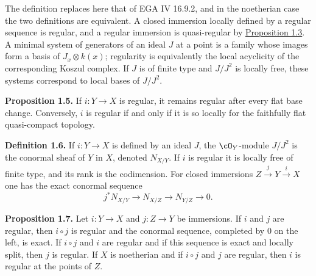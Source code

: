 The definition replaces here that of EGA IV 16.9.2, and in the noetherian case the two definitions are equivalent. A closed immersion locally defined by a regular sequence is regular, and a regular immersion is quasi-regular by \hyperlink{sga6.e07.prop.1-3}{Proposition 1.3}. A minimal system of generators of an ideal \(J\) at a point is a family whose images form a basis of \(J_x\otimes k(x)\); regularity is equivalently the local acyclicity of the corresponding Koszul complex. If \(J\) is of finite type and \(J/J^2\) is locally free, these systems correspond to local bases of \(J/J^2\).

\textbf{Proposition 1.5.} If \(i:Y\to X\) is regular, it remains regular after every flat base change. Conversely, \(i\) is regular if and only if it is so locally for the faithfully flat quasi-compact topology.

\textbf{Definition 1.6.} If \(i:Y\to X\) is defined by an ideal \(J\), the \(\cO_Y\)-module \(J/J^2\) is the conormal sheaf of \(Y\) in \(X\), denoted \(N_{X/Y}\). If \(i\) is regular it is locally free of finite type, and its rank is the codimension. For closed immersions \(Z\xrightarrow{j}Y\xrightarrow{i}X\) one has the exact conormal sequence
\begin{equation}\tag{1.6.1}
 j^*N_{X/Y}\longrightarrow N_{X/Z}\longrightarrow N_{Y/Z}\longrightarrow0.
\end{equation}

\textbf{Proposition 1.7.} Let \(i:Y\to X\) and \(j:Z\to Y\) be immersions. If \(i\) and \(j\) are regular, then \(i\circ j\) is regular and the conormal sequence, completed by \(0\) on the left, is exact. If \(i\circ j\) and \(i\) are regular and if this sequence is exact and locally split, then \(j\) is regular. If \(X\) is noetherian and if \(i\circ j\) and \(j\) are regular, then \(i\) is regular at the points of \(Z\).

